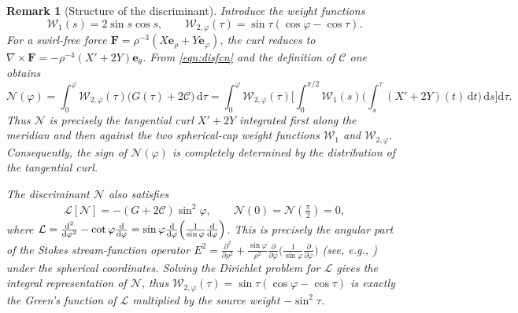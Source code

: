 \documentclass{amsart}
\newtheorem{remark}{Remark}[section]
\newcommand{\Be}{{\boldsymbol{e}}}
\newcommand{\BF}{{\boldsymbol{F}}}
\newcommand{\mcC}{\mathcal{C}}
\begin{document}
\begin{remark}[Structure of the discriminant]
Introduce the weight functions
\[
\mathcal{W}_1(s)=2\sin s\cos s,\qquad
\mathcal{W}_{2,\varphi}(\tau)=\sin\tau(\cos\varphi-\cos\tau).
\]
For a swirl-free force $\BF=\rho^{-3}(X\Be_\rho+Y\Be_\varphi)$, the curl reduces to
$\nabla\times\BF = -\rho^{-4}(X'+2Y)\Be_\theta$.
From \eqref{eqn:disfcn} and the definition of $\mcC$ one obtains
\[
\mathcal{N}(\varphi)
= \int_{0}^{\varphi} \mathcal{W}_{2,\varphi}(\tau)\bigl(G(\tau)+2\mcC\bigr)\,\mathrm{d}\tau
= \int_{0}^{\varphi} \mathcal{W}_{2,\varphi}(\tau)
   \Biggl[ \int_{0}^{\pi/2} \mathcal{W}_1(s)
      \biggl( \int_{s}^{\tau} (X'+2Y)(t)\,\mathrm{d}t \biggr)
      \,\mathrm{d}s \Biggr] \mathrm{d}\tau .
\]
Thus $\mathcal{N}$ is precisely the tangential curl $X'+2Y$ integrated first along the meridian
and then against the two spherical-cap weight functions $\mathcal{W}_1$ and $\mathcal{W}_{2,\varphi}$.
Consequently, the sign of $\mathcal{N}(\varphi)$ is completely determined by the distribution of the
tangential curl.

The discriminant $\mathcal{N}$ also satisfies
\begin{align}\label{eqn:discriminantN}
\mathcal{L}[\mathcal{N}] = -(G+2\mcC)\sin^{2}\varphi,\qquad
\mathcal{N}(0)=\mathcal{N}(\tfrac{\pi}{2})=0,
\end{align}
where $\mathcal{L}= \frac{\mathrm{d}^{2}}{\mathrm{d}\varphi^{2}}-\cot\varphi\frac{\mathrm{d}}{\mathrm{d}\varphi}
= \sin\varphi\frac{\mathrm{d}}{\mathrm{d}\varphi}\Bigl(\frac{1}{\sin\varphi}\frac{\mathrm{d}}{\mathrm{d}\varphi}\Bigr)$.
This is precisely the angular part of the Stokes stream-function operator
$E^{2}= \frac{\partial^{2}}{\partial\rho^{2}} + \frac{\sin\varphi}{\rho^{2}}\frac{\partial}{\partial\varphi}\!\bigl(\frac{1}{\sin\varphi}\frac{\partial}{\partial\varphi}\bigr)$
(see, e.g., \cite[eq.~(4-7.18)]{HB65}) under the spherical coordinates.
Solving the Dirichlet problem for $\mathcal{L}$ gives the integral representation of $\mathcal{N}$, thus
$\mathcal{W}_{2,\varphi}(\tau)=\sin\tau(\cos\varphi-\cos\tau)$ is exactly the Green's function of $\mathcal{L}$
multiplied by the source weight $-\sin^{2}\tau$.

\end{remark}
\end{document}

